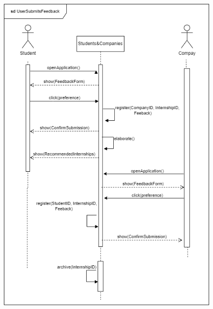 \documentclass[a4paper,12pt]{article}
\begin{document}
\begin{figure}[H]
    \centering
    \includegraphics[scale = 0.45]{figures/UseCasesSD/UserSubmitsFeedbackSD.drawio.png}
\end{figure}
\newpage
\end{document}
